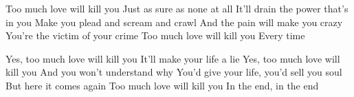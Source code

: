 \documentclass[../../../songbook.tex]{subfiles}
\begin{document}
\-\hspace{1cm} Too much love will kill you						 \newline
\-\hspace{1cm} Just as sure as none at all						 \newline
\-\hspace{1cm} It'll drain the power that's in you					 \newline
\-\hspace{1cm} Make you plead and scream and crawl					 \newline
\-\hspace{1cm} And the pain will make you crazy					 \newline
\-\hspace{1cm} You're the victim of your crime					 \newline	
\-\hspace{1cm} Too much love will kill you						 \newline
\-\hspace{1cm} Every time								 \newline

\-\hspace{1cm} Yes, too much love will kill you						 \newline
\-\hspace{1cm} It'll make your life a lie					 \newline		 
\-\hspace{1cm} Yes, too much love will kill you						 \newline
\-\hspace{1cm} And you won't understand why						 \newline
\-\hspace{1cm} You'd give your life, you'd sell you soul					 \newline
\-\hspace{1cm} But here it comes again						 \newline	
\-\hspace{1cm} Too much love will kill you					 \newline	
\-\hspace{1cm} In the end, in the end					 \newline		
\end{document}
